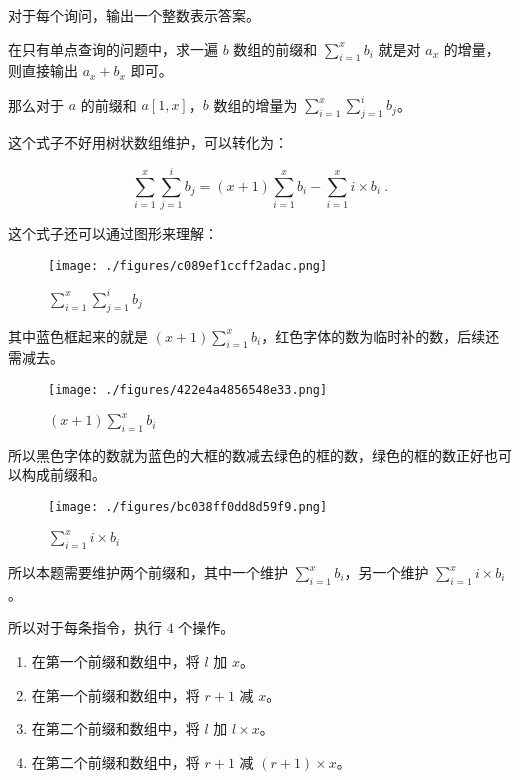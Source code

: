 对于每个询问，输出一个整数表示答案。

在只有单点查询的问题中，求一遍 $b$ 数组的前缀和 $\sum\limits^x_{i=1}b_i$ 就是对 $a_x$ 的增量，则直接输出 $a_x + b_x$ 即可。

那么对于 $a$ 的前缀和 $a[1, x]$，$b$ 数组的增量为 $\sum\limits^x_{i=1}\sum\limits^i_{j=1}b_j$。

这个式子不好用树状数组维护，可以转化为：

\begin{equation}
\sum\limits^x_{i=1}\sum\limits^i_{j=1}b_j = (x + 1)\sum\limits^x_{i=1}b_i - \sum\limits^x_{i=1}i \times b_i~.
\end{equation}

这个式子还可以通过图形来理解：

\begin{figure}[ht]
\centering
\texttt{[image: ./figures/c089ef1ccff2adac.png]}
\caption{$\sum\limits^x_{i=1}\sum\limits^i_{j=1}b_j$} \label{fig_BIT_3}
\end{figure}


其中蓝色框起来的就是 $(x + 1)\sum\limits^x_{i=1}b_i$，红色字体的数为临时补的数，后续还需减去。

\begin{figure}[ht]
\centering
\texttt{[image: ./figures/422e4a4856548e33.png]}
\caption{$(x + 1)\sum\limits^x_{i=1}b_i$} \label{fig_BIT_4}
\end{figure}

所以黑色字体的数就为蓝色的大框的数减去绿色的框的数，绿色的框的数正好也可以构成前缀和。

\begin{figure}[ht]
\centering
\texttt{[image: ./figures/bc038ff0dd8d59f9.png]}
\caption{$\sum\limits^x_{i=1}i \times b_i$} \label{fig_BIT_5}
\end{figure}

所以本题需要维护两个前缀和，其中一个维护 $\sum\limits^x_{i=1}b_i$，另一个维护 $\sum\limits^x_{i=1}i \times b_i$。

所以对于每条指令，执行 $4$ 个操作。

\begin{enumerate}
\item 在第一个前缀和数组中，将 $l$ 加 $x$。
\item 在第一个前缀和数组中，将 $r+1$ 减 $x$。
\item 在第二个前缀和数组中，将 $l$ 加 $l \times x$。
\item 在第二个前缀和数组中，将 $r + 1$ 减 $(r + 1) \times x$。
\end{enumerate}

